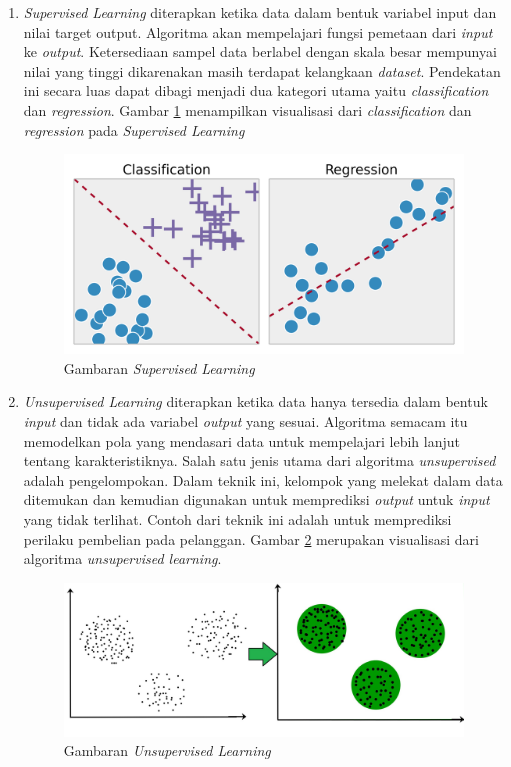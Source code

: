 \begin{enumerate}
	\item \textit{Supervised Learning} diterapkan ketika data dalam bentuk variabel input dan nilai target output. Algoritma akan mempelajari fungsi pemetaan dari \textit{input} ke \textit{output}. Ketersediaan sampel data berlabel dengan skala besar mempunyai nilai yang tinggi dikarenakan masih terdapat kelangkaan \textit{dataset}. Pendekatan ini secara luas dapat dibagi menjadi dua kategori utama yaitu \textit{classification} dan \textit{regression}. Gambar \ref{fig:supervised} menampilkan visualisasi dari \textit{classification} dan \textit{regression} pada \textit{Supervised Learning}
	
	\begin{figure}[ht]
		\centering
		\includegraphics[scale=0.1]{gambar/supervised.png}
		\caption{Gambaran \textit{Supervised Learning}\citep{supervised}}
		\label{fig:supervised}
	\end{figure}  
	
	\item \textit{Unsupervised Learning} diterapkan ketika data hanya tersedia dalam bentuk \textit{input} dan tidak ada variabel \textit{output} yang sesuai. Algoritma semacam itu memodelkan pola yang mendasari data untuk mempelajari lebih lanjut tentang karakteristiknya. Salah satu jenis utama dari algoritma \textit{unsupervised} adalah pengelompokan. Dalam teknik ini, kelompok yang melekat dalam data ditemukan dan kemudian digunakan untuk memprediksi \textit{output} untuk \textit{input} yang tidak terlihat. Contoh dari teknik ini adalah untuk memprediksi perilaku pembelian pada pelanggan. Gambar \ref{fig:unsupervised} merupakan visualisasi dari algoritma \textit{unsupervised learning}.
	
	\begin{figure}[ht]
		\centering
		\includegraphics[scale=0.2]{gambar/unsupervised.jpg}
		\caption{Gambaran \textit{Unsupervised Learning}\citep{unsupervised}}
		\label{fig:unsupervised}
	\end{figure}
	

\end{enumerate}
